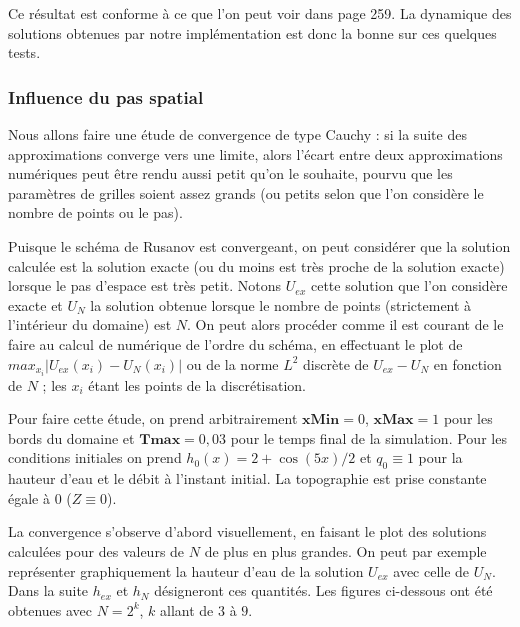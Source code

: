 \documentclass[
11pt, %
francais, %
singlespacing, %
headsepline, %
f%
]{MastersDoctoralThesis} %
\theoremstyle{definition}
\begin{document}
Ce résultat est conforme à ce que l'on peut voir dans \cite{RL} page 259. La dynamique des solutions obtenues par notre implémentation est donc la bonne sur ces quelques tests.

\subsubsection{Influence du pas spatial}

Nous allons faire une étude de convergence de type Cauchy : si la suite des approximations converge vers une limite, alors l'écart entre deux approximations numériques peut être rendu aussi petit qu'on le souhaite, pourvu que les paramètres de grilles soient assez grands (ou petits selon que l'on considère le nombre de points ou le pas).

Puisque le schéma de Rusanov est convergeant, on peut considérer que la solution calculée est la solution exacte (ou du moins est très proche de la solution exacte) lorsque le pas d'espace est très petit. Notons $U_{ex}$ cette solution que l'on considère exacte et $U_N$ la solution obtenue lorsque le nombre de points (strictement à l'intérieur du domaine) est $N$. On peut alors procéder comme il est courant de le faire au calcul de numérique de l'ordre du schéma, en effectuant le plot de $max_{x_i}|U_{ex}(x_i)-U_N(x_i)|$ ou de la norme $L^{2}$ discrète de $U_{ex}-U_N$ en fonction de $N$ ; les $x_i$ étant les points de la discrétisation.

Pour faire cette étude, on prend arbitrairement $\textbf{xMin}=0$, $\textbf{xMax}=1$  pour les bords du domaine et $\textbf{Tmax}=0,03$ pour le temps final de la simulation. Pour les conditions initiales on prend $h_{0}(x) = 2+\cos(5x)/2$ et $q_{0}\equiv 1$ pour la hauteur d'eau et le débit à l'instant initial. La topographie est prise constante égale à 0 ($Z\equiv 0$).

La convergence s'observe d'abord visuellement, en faisant le plot des solutions calculées pour des valeurs de $N$ de plus en plus grandes. On peut par exemple représenter graphiquement la hauteur d'eau de la solution $U_{ex}$ avec celle de  $U_N$. Dans la suite $h_{ex}$ et $h_{N}$ désigneront ces quantités. Les figures ci-dessous ont été obtenues avec $N=2^{k}$, $k$ allant de $3$ à $9$.
\end{document}
